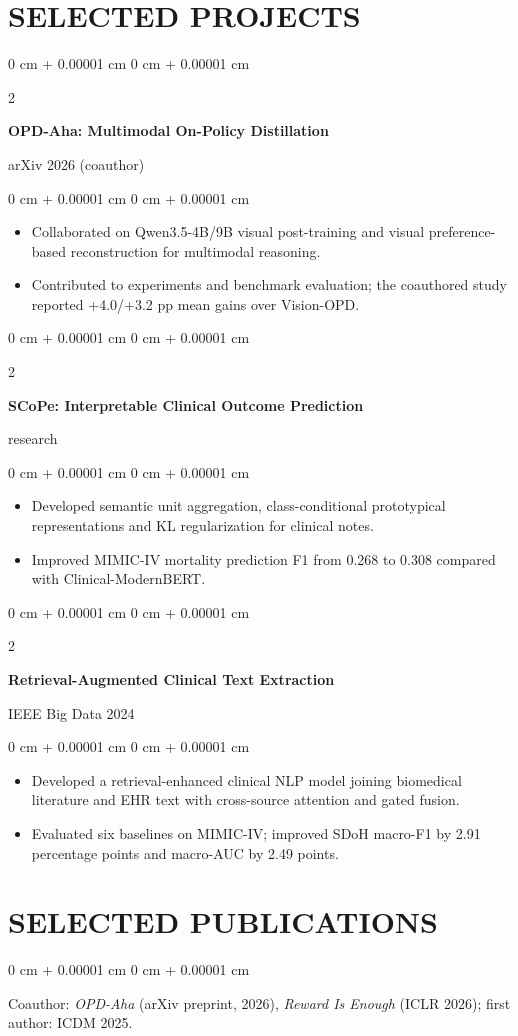 \documentclass[10pt, letterpaper]{article}
\newenvironment{highlights}{
    \begin{itemize}[
        topsep=0.10 cm,
        parsep=0.10 cm,
        partopsep=0pt,
        itemsep=0pt,
        leftmargin=0 cm + 10pt
    ]
}{
    \end{itemize}
} %
\newenvironment{onecolentry}{
    \begin{adjustwidth}{
        0 cm + 0.00001 cm
    }{
        0 cm + 0.00001 cm
    }
}{
    \end{adjustwidth}
} %
\newenvironment{twocolentry}[2][]{
    \onecolentry
    \def\secondColumn{#2}
    \setcolumnwidth{\fill, 4.5 cm}
    \begin{paracol}{2}
}{
    \switchcolumn \raggedleft \secondColumn
    \end{paracol}
    \endonecolentry
} %
\begin{document}
\section{SELECTED PROJECTS}
\begin{twocolentry}{arXiv 2026 (coauthor)}
\textbf{OPD-Aha: Multimodal On-Policy Distillation}
\end{twocolentry}
\begin{onecolentry}
\begin{highlights}
\item Collaborated on Qwen3.5-4B/9B visual post-training and visual preference-based reconstruction for multimodal reasoning.
\item Contributed to experiments and benchmark evaluation; the coauthored study reported +4.0/+3.2 pp mean gains over Vision-OPD.
\end{highlights}
\end{onecolentry}
\vspace{0.03 cm}
\begin{twocolentry}{2026 research}
\textbf{SCoPe: Interpretable Clinical Outcome Prediction}
\end{twocolentry}
\begin{onecolentry}
\begin{highlights}
\item Developed semantic unit aggregation, class-conditional prototypical representations and KL regularization for clinical notes.
\item Improved MIMIC-IV mortality prediction F1 from 0.268 to 0.308 compared with Clinical-ModernBERT.
\end{highlights}
\end{onecolentry}
\vspace{0.03 cm}
\begin{twocolentry}{IEEE Big Data 2024}
\textbf{Retrieval-Augmented Clinical Text Extraction}
\end{twocolentry}
\begin{onecolentry}
\begin{highlights}
\item Developed a retrieval-enhanced clinical NLP model joining biomedical literature and EHR text with cross-source attention and gated fusion.
\item Evaluated six baselines on MIMIC-IV; improved SDoH macro-F1 by 2.91 percentage points and macro-AUC by 2.49 points.
\end{highlights}
\end{onecolentry}
\vspace{0.03 cm}
\section{SELECTED PUBLICATIONS}
\begin{onecolentry}
Coauthor: \textit{OPD-Aha} (arXiv preprint, 2026), \textit{Reward Is Enough} (ICLR 2026); first author: ICDM 2025.
\end{onecolentry}
\end{document}
